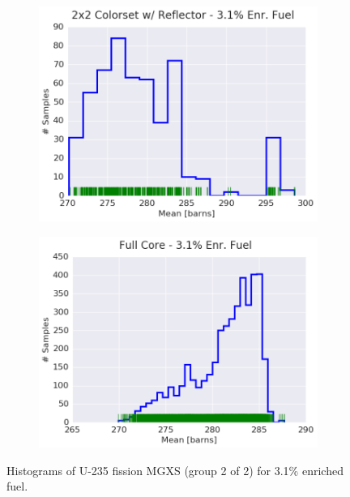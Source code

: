 \begin{figure}[h!]
\begin{subfigure}{0.5\textwidth}
  \includegraphics[width=\linewidth]{figures/patterns/reflector/hist-kde-rug/31-enr-fiss-2}  \caption{}
  \label{fig:chap9-hist-reflector-3.1-fiss}
\end{subfigure}%
\begin{subfigure}{0.5\textwidth}
  \centering
  \includegraphics[width=\linewidth]{figures/patterns/full-core/hist-kde-rug/31-enr-fiss-2} \caption{}
  \label{fig:chap9-hist-full-core-3.1-fiss}
\end{subfigure}
\caption[Histogram of U-235 fission MGXS 3.1\% enriched fuel]{Histograms of U-235 fission \ac{MGXS} (group 2 of 2) for 3.1\% enriched fuel.}
\label{fig:chap9-hist-3.1-fiss}
\end{figure}



